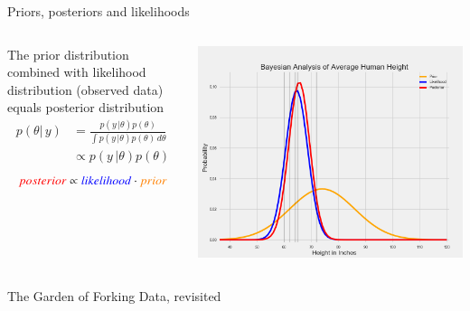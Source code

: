 \documentclass[12pt, aspectratio=149]{beamer}
\theoremstyle{plain}
\begin{document}
\begin{frame}[fragile]{Priors, posteriors and likelihoods}
	\begin{columns}
		\begin{column}{0.5\linewidth}
			The prior distribution combined with likelihood distribution (observed data) equals posterior distribution
			\begin{equation*}
			\begin{split}
			p(\theta \vert \, y) & =  \frac{p(y \, \vert \theta)p(\theta)}{\int p(y \, \vert \theta)p(\theta) \, d\theta} \\
			& \propto p(y \, \vert \theta)p(\theta)
			\end{split}
			\end{equation*}
			\begin{equation*}
			\textcolor{red}{posterior} \propto \textcolor{blue}{likelihood} \cdot \textcolor{orange}{prior}
			\end{equation*}
		\end{column}
		\begin{column}{0.5\linewidth}
			\includegraphics[scale=0.17]{figs/prior_likelihood_posterior_example.png}
		\end{column}
	\end{columns}
\end{frame}

\begin{frame}[fragile]{The Garden of Forking Data, revisited}
	\inputminted[fontsize=\tiny]{python}{../code/marbles.py}
\end{frame}
\end{document}
